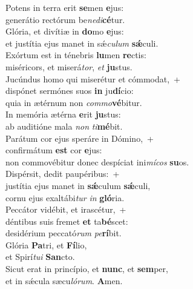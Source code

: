 \evenverse Potens in terra erit \textbf{se}men \textbf{e}jus:~\*\\
\evenverse generátio rectórum be\textit{ne}\textit{di}\textbf{cé}tur.\\
\oddverse Glória, et divítiæ in \textbf{do}mo \textbf{e}jus:~\*\\
\oddverse et justítia ejus manet in sǽ\textit{cu}\textit{lum} \textbf{sǽ}culi.\\
\evenverse Exórtum est in ténebris \textbf{lu}men \textbf{re}ctis:~\*\\
\evenverse miséricors, et miserá\textit{tor}, \textit{et} \textbf{ju}stus.\\
\oddverse Jucúndus homo qui miserétur et cómmodat,~+\\
\oddverse  dispónet sermónes suos \textbf{in} ju\textbf{dí}cio:~\*\\
\oddverse quia in ætérnum non \textit{com}\textit{mo}\textbf{vé}bitur.\\
\evenverse In memória ætérna \textbf{e}rit \textbf{ju}stus:~\*\\
\evenverse ab auditióne mala \textit{non} \textit{ti}\textbf{mé}bit.\\
\oddverse Parátum cor ejus speráre in Dómino,~+\\
\oddverse  confirmátum \textbf{est} cor \textbf{e}jus:~\*\\
\oddverse non commovébitur donec despíciat ini\textit{mí}\textit{cos} \textbf{su}os.\\
\evenverse Dispérsit, dedit paupéribus:~+\\
\evenverse  justítia ejus manet in \textbf{sǽ}culum \textbf{sǽ}culi,~\*\\
\evenverse cornu ejus exaltábi\textit{tur} \textit{in} \textbf{gló}ria.\\
\oddverse Peccátor vidébit, et irascétur,~+\\
\oddverse  déntibus suis fremet \textbf{et} ta\textbf{bé}scet:~\*\\
\oddverse desidérium peccató\textit{rum} \textit{pe}\textbf{rí}bit.\\
\evenverse Glória \textbf{Pa}tri, et \textbf{Fí}lio,~\*\\
\evenverse et Spirí\textit{tu}\textit{i} \textbf{San}cto.\\
\oddverse Sicut erat in princípio, et \textbf{nunc}, et \textbf{sem}per,~\*\\
\oddverse et in sǽcula sæcu\textit{ló}\textit{rum}. \textbf{A}men.\\
